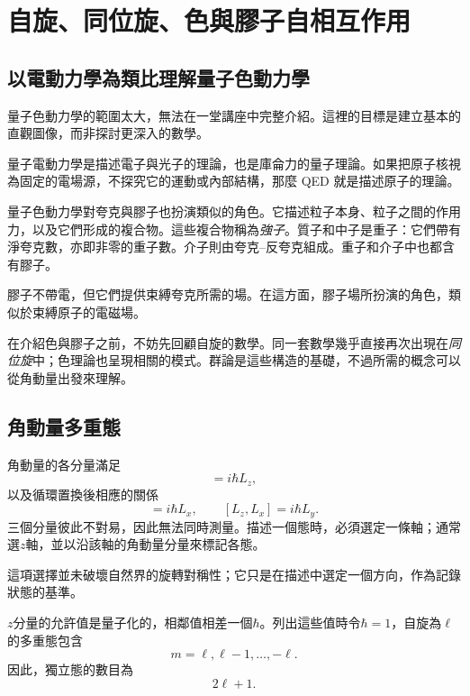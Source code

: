 \chapter{自旋、同位旋、色與膠子自相互作用}

\section{以電動力學為類比理解量子色動力學}

量子色動力學的範圍太大，無法在一堂講座中完整介紹。這裡的目標是建立基本的直觀圖像，而非探討更深入的數學。

量子電動力學是描述電子與光子的理論，也是庫侖力的量子理論。如果把原子核視為固定的電場源，不探究它的運動或內部結構，那麼 QED 就是描述原子的理論。

量子色動力學對夸克與膠子也扮演類似的角色。它描述粒子本身、粒子之間的作用力，以及它們形成的複合物。這些複合物稱為\emph{強子}。質子和中子是重子：它們帶有淨夸克數，亦即非零的重子數。介子則由夸克--反夸克組成。重子和介子中也都含有膠子。

膠子不帶電，但它們提供束縛夸克所需的場。在這方面，膠子場所扮演的角色，類似於束縛原子的電磁場。

在介紹色與膠子之前，不妨先回顧自旋的數學。同一套數學幾乎直接再次出現在\emph{同位旋}中；色理論也呈現相關的模式。群論是這些構造的基礎，不過所需的概念可以從角動量出發來理解。

\section{角動量多重態}

角動量的各分量滿足
\begin{equation}
[L_x,L_y]=i\hbar L_z,
\end{equation}
以及循環置換後相應的關係
\begin{equation}
[L_y,L_z]=i\hbar L_x,
\qquad
[L_z,L_x]=i\hbar L_y.
\end{equation}
三個分量彼此不對易，因此無法同時測量。描述一個態時，必須選定一條軸；通常選\(z\)軸，並以沿該軸的角動量分量來標記各態。

這項選擇並未破壞自然界的旋轉對稱性；它只是在描述中選定一個方向，作為記錄狀態的基準。

\(z\)分量的允許值是量子化的，相鄰值相差一個\(\hbar\)。列出這些值時令\(\hbar=1\)，自旋為\(\ell\)的多重態包含
\begin{equation}
m=\ell,\ell-1,\ldots,-\ell.
\end{equation}
因此，獨立態的數目為
\begin{equation}
2\ell+1.
\end{equation}

